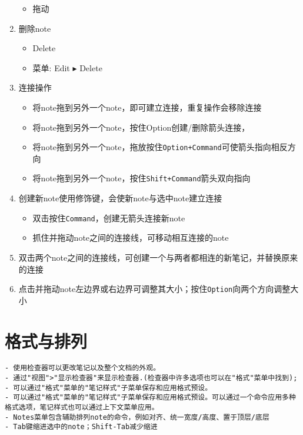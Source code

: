 \documentclass{../main.tex}{subfiles}
\begin{document}
\begin{enumerate}[itemsep=0pt, parsep=0pt, topsep=0pt, partopsep=0pt]
\begin{itemize}[itemsep=0pt, parsep=0pt, topsep=0pt, partopsep=0pt]
        \item 拖动
      \end{itemize}
  \item 删除note
      \begin{itemize}[itemsep=0pt, parsep=0pt, topsep=0pt, partopsep=0pt]
        \item Delete
        \item 菜单: Edit $\blacktriangleright$ Delete
      \end{itemize}
  \item 连接操作
      \begin{itemize}[itemsep=0pt, parsep=0pt, topsep=0pt, partopsep=0pt]
        \item 将note拖到另外一个note，即可建立连接，重复操作会移除连接
        \item 将note拖到另外一个note，按住Option创建/删除箭头连接，
        \item 将note拖到另外一个note，拖放按住\texttt{Option+Command}可使箭头指向相反方向
        \item 将note拖到另外一个note，按住\texttt{Shift+Command}箭头双向指向
      \end{itemize}
  \item 创建新note使用修饰键，会使新note与选中note建立连接
      \begin{itemize}[itemsep=0pt, parsep=0pt, topsep=0pt, partopsep=0pt]
        \item 双击按住\texttt{Command}，创建无箭头连接新note
        \item 抓住并拖动note之间的连接线，可移动相互连接的note
      \end{itemize}
  \item 双击两个note之间的连接线，可创建一个与两者都相连的新笔记，并替换原来的连接
  \item 点击并拖动note左边界或右边界可调整其大小；按住\texttt{Option}向两个方向调整大小
\end{enumerate}


\section{格式与排列}
\begin{lstlisting}[style=lstCodeStylePlainText]
- 使用检查器可以更改笔记以及整个文档的外观。
- 通过"视图">"显示检查器"来显示检查器.(检查器中许多选项也可以在"格式"菜单中找到);
- 可以通过"格式"菜单的"笔记样式"子菜单保存和应用格式预设。
- 可以通过"格式"菜单的"笔记样式"子菜单保存和应用格式预设。可以通过一个命令应用多种格式选项，笔记样式也可以通过上下文菜单应用。
- Notes菜单包含辅助排列note的命令，例如对齐、统一宽度/高度、置于顶层/底层
- Tab键缩进选中的note；Shift-Tab减少缩进
\end{lstlisting}
\end{document}
